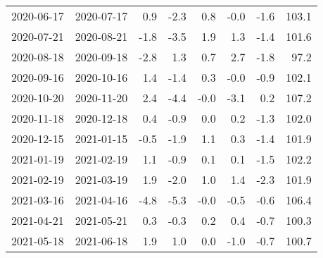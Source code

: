 \begin{tabular}{llrrrrrr}
 2020-06-17 & 2020-07-17 &      0.9 &       -2.3 &        0.8 &      -0.0 &      -1.6 &       103.1 \\
 2020-07-21 & 2020-08-21 &     -1.8 &       -3.5 &        1.9 &       1.3 &      -1.4 &       101.6 \\
 2020-08-18 & 2020-09-18 &     -2.8 &        1.3 &        0.7 &       2.7 &      -1.8 &        97.2 \\
 2020-09-16 & 2020-10-16 &      1.4 &       -1.4 &        0.3 &      -0.0 &      -0.9 &       102.1 \\
 2020-10-20 & 2020-11-20 &      2.4 &       -4.4 &       -0.0 &      -3.1 &       0.2 &       107.2 \\
 2020-11-18 & 2020-12-18 &      0.4 &       -0.9 &        0.0 &       0.2 &      -1.3 &       102.0 \\
 2020-12-15 & 2021-01-15 &     -0.5 &       -1.9 &        1.1 &       0.3 &      -1.4 &       101.9 \\
 2021-01-19 & 2021-02-19 &      1.1 &       -0.9 &        0.1 &       0.1 &      -1.5 &       102.2 \\
 2021-02-19 & 2021-03-19 &      1.9 &       -2.0 &        1.0 &       1.4 &      -2.3 &       101.9 \\
 2021-03-16 & 2021-04-16 &     -4.8 &       -5.3 &       -0.0 &      -0.5 &      -0.6 &       106.4 \\
 2021-04-21 & 2021-05-21 &      0.3 &       -0.3 &        0.2 &       0.4 &      -0.7 &       100.3 \\
 2021-05-18 & 2021-06-18 &      1.9 &        1.0 &        0.0 &      -1.0 &      -0.7 &       100.7 \\
\hline
\end{tabular}